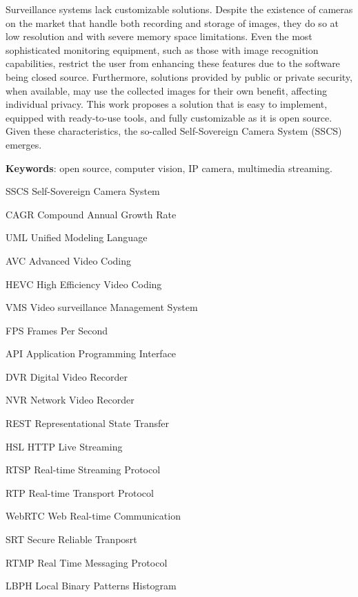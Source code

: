 \documentclass[12pt, %
openright, 
oneside, %
a4paper,    %
brazil]{facom-ufu-abntex2}
\begin{document}
\begin{resumo}[Abstract]

	Surveillance systems lack customizable solutions. Despite the existence of
	cameras on the market that handle both recording and storage of images, they do
	so at low resolution and with severe memory space limitations. Even the most
	sophisticated monitoring equipment, such as those with image recognition
	capabilities, restrict the user from enhancing these features due to the
	software being closed source. Furthermore, solutions provided by public or
	private security, when available, may use the collected images for their own
	benefit, affecting individual privacy. This work proposes a solution that is
	easy to implement, equipped with ready-to-use tools, and fully customizable as
	it is open source. Given these characteristics, the so-called Self-Sovereign
	Camera System (SSCS) emerges.

	\vspace{\onelineskip}
	\noindent
	\textbf{Keywords}: open source, computer vision, IP camera, multimedia streaming.
\end{resumo}

\listoffigures*
\cleardoublepage

\listoftables*
\cleardoublepage

\begin{siglas} %

	\item[SSCS] Self-Sovereign Camera System
	\item[CAGR] Compound Annual Growth Rate
	\item[UML] Unified Modeling Language
	\item[AVC] Advanced Video Coding
	\item[HEVC] High Efficiency Video Coding
	\item[VMS] Video surveillance Management System
	\item[FPS] Frames Per Second
	\item[API] Application Programming Interface
	\item[DVR] Digital Video Recorder
	\item[NVR] Network Video Recorder
	\item[REST] Representational State Transfer
	\item[HSL] HTTP Live Streaming
	\item[RTSP] Real-time Streaming Protocol
	\item[RTP] Real-time Transport Protocol
	\item[WebRTC] Web Real-time Communication
	\item[SRT] Secure Reliable Tranposrt
	\item[RTMP] Real Time Messaging Protocol
	\item[LBPH] Local Binary Patterns Histogram

\end{siglas}
\end{document}

